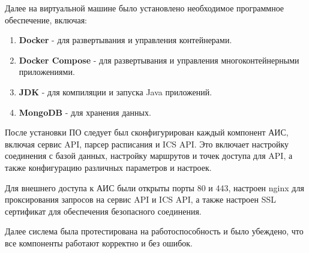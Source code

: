 Далее на виртуальной машине было установлено необходимое программное обеспечение, включая:
\begin{enumerate}
    \item \textbf{Docker} - для развертывания и управления контейнерами.
    \item \textbf{Docker Compose} - для развертывания и управления многоконтейнерными приложениями.
    \item \textbf{JDK} - для компиляции и запуска Java приложений.
    \item \textbf{MongoDB} - для хранения данных.
\end{enumerate}

После установки ПО следует был сконфигурирован каждый компонент АИС, 
включая сервис API, парсер расписания и ICS API. 
Это включает настройку соединения с базой данных, 
настройку маршрутов и точек доступа для API, 
а также конфигурацию различных параметров и настроек.

Для внешнего доступа к АИС были открыты порты 80 и 443,
настроен nginx для проксирования запросов на сервис API и ICS API,
а также настроен SSL сертификат для обеспечения безопасного соединения.

Далее сислема была протестирована на работоспособность и было убеждено,
что все компоненты работают корректно и без ошибок.